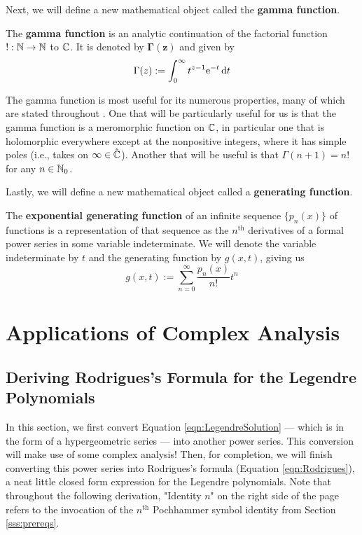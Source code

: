 \documentclass[titlepage]{article}
\numberwithin{equation}{section}
\begin{document}
Next, we will define a new mathematical object called the \textbf{gamma function}.
\begin{definition}
    The \textbf{gamma function} is an analytic continuation of the factorial function $!:\N\to\N$ to $\C$. It is denoted by $\bm{\Gamma(z)}$ and given by
    \begin{equation*}
        \Gamma(z) := \int_0^\infty t^{z-1}\e[-t]\dd{t}
    \end{equation*}
\end{definition}
The gamma function is most useful for its numerous properties, many of which are stated throughout \textcite{bib:Seaborn}. One that will be particularly useful for us is that the gamma function is a meromorphic function on $\C$, in particular one that is holomorphic everywhere except at the nonpositive integers, where it has simple poles (i.e., takes on $\infty\in\hat{\C}$). Another that will be useful is that $\Gamma(n+1)=n!$ for any $n\in\N_0$.\par
Lastly, we will define a new mathematical object called a \textbf{generating function}.
\begin{definition}
    The \textbf{exponential generating function} of an infinite sequence $\{p_n(x)\}$ of functions is a representation of that sequence as the $n^\text{th}$ derivatives of a formal power series in some variable indeterminate. We will denote the variable indeterminate by $t$ and the generating function by $g(x,t)$, giving us
    \begin{equation*}
        g(x,t) := \sum_{n=0}^\infty\frac{p_n(x)}{n!}t^n
    \end{equation*}
\end{definition}
\newpage



\section{Applications of Complex Analysis}\label{sse:applications}
\subsection{Deriving Rodrigues's Formula for the Legendre Polynomials}
In this section, we first convert Equation \ref{eqn:LegendreSolution} --- which is in the form of a hypergeometric series --- into another power series. This conversion will make use of some complex analysis! Then, for completion, we will finish converting this power series into Rodrigues's formula (Equation \ref{eqn:Rodrigues}), a neat little closed form expression for the Legendre polynomials. Note that throughout the following derivation, "Identity $n$" on the right side of the page refers to the invocation of the $n^\text{th}$ Pochhammer symbol identity from Section \ref{sss:prereqs}.
\end{document}
